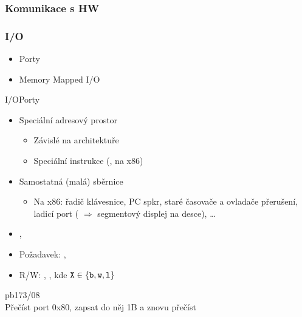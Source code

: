 
\begin{frame}
  \frametitle{Komunikace s HW}


  \iffimuni
    \bigskip

    \tableofcontents
  \fi

\end{frame}


\begin{frame}
  \frametitle{I/O}
  \begin{itemize}
  \item Porty
  \item Memory Mapped I/O
  \end{itemize}

\end{frame}

\begin{frame}{I/O}{Porty}

  \begin{itemize}
    \item Speciální adresový prostor
    \begin{itemize}
      \item Závislé na architektuře
      \item Speciální instrukce (,  na x86)
    \end{itemize}

    \pause

    \item Samostatná (malá) sběrnice
    \begin{itemize}
      \item Na x86: řadič klávesnice, PC spkr, staré časovače a ovladače
      přerušení, ladicí port ( $\Rightarrow$ segmentový displej
      na desce), \dots
    \end{itemize}
  \end{itemize}

  \pause

  \begin{itemize}
  \item {}, 
  \item Požadavek: , 
  \item R/W: , , kde
    $\text{\code{X}}\in\left\{\text{\code{b}},\text{\code{w}},\text{\code{l}}\right\}$
  \end{itemize}

  \medskip
  \pause

   pb173/08 \\
  \iffimuni
   Přečíst port 0x80, zapsat do něj 1B a znovu přečíst
  \fi

\end{frame}

